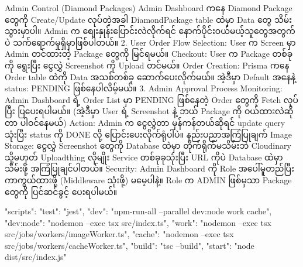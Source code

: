 Admin Control (Diamond Packages)
Admin Dashboard ကနေ Diamond Package တွေကို Create/Update လုပ်တဲ့အခါ DiamondPackage table ထဲမှာ 
Data တွေ သိမ်းသွားမှာပါ။ Admin က စျေးနှုန်းပြောင်းလဲလိုက်ရင် နောက်ပိုင်းဝယ်မယ့်သူတွေအတွက်ပဲ သက်ရောက်မှုရှိမှာဖြစ်ပါတယ်။
2. User Order Flow
Selection: User က Screen မှာ Admin တင်ထားတဲ့ Package တွေကို မြင်ရမယ်။
Checkout: User က Package တစ်ခုကို ရွေးပြီး ငွေလွှဲ Screenshot ကို Upload တင်မယ်။
Order Creation: Prisma ကနေ Order table ထဲကို Data အသစ်တစ်ခု ဆောက်ပေးလိုက်မယ်။ 
အဲ့ဒီမှာ Default အနေနဲ့ status: PENDING ဖြစ်နေပါလိမ့်မယ်။
3. Admin Approval Process
Monitoring: Admin Dashboard ရဲ့ Order List မှာ PENDING ဖြစ်နေတဲ့ Order တွေကို Fetch လုပ်ပြီး ပြပေးရပါမယ်။
 (အဲ့ဒီမှာ User ရဲ့ Screenshot နဲ့ ဘယ် Package ကို ဝယ်ထားလဲဆိုတာ ပါဝင်နေမယ်)
Action: Admin က ငွေလွှဲတာ မှန်ကန်တယ်ဆိုရင် update query   သုံးပြီး status ကို DONE လို့ ပြောင်းပေးလိုက်ရုံပါပဲ။
နည်းပညာအကြံပြုချက်
Image Storage: ငွေလွှဲ Screenshot တွေကို Database ထဲမှာ တိုက်ရိုက်မသိမ်းဘဲ 
Cloudinary သို့မဟုတ် Uploadthing လိုမျိုး Service တစ်ခုခုသုံးပြီး URL ကိုပဲ Database ထဲမှာ သိမ်းဖို့ အကြံပြုချင်ပါတယ်။
Security: Admin Dashboard ကို Role အပေါ်မူတည်ပြီး ကာကွယ်ထားဖို့ (Middleware သုံးဖို့)
 မမေ့ပါနဲ့။ Role က ADMIN ဖြစ်မှသာ Package တွေကို ပြင်ဆင်ခွင့် ပေးရပါမယ်။


 "scripts": {
  "test": "jest",
  "dev": "npm-run-all --parallel dev:node work cache",
  "dev:node": "nodemon --exec tsx src/index.ts",
  "work": "nodemon --exec tsx src/jobs/workers/imageWorker.ts",
  "cache": "nodemon --exec tsx src/jobs/workers/cacheWorker.ts",
  "build": "tsc --build", 
  "start": "node dist/src/index.js"
}